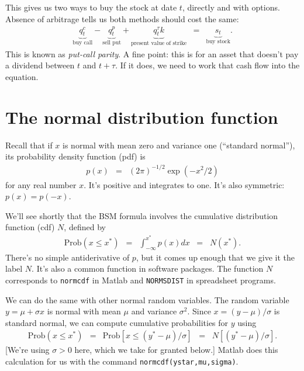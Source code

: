 \documentclass[11pt]{article}
\begin{document}
This gives us two ways to buy the stock at date $t$,
directly and with options.
Absence of arbitrage tells us both methods should cost the same:
\begin{eqnarray}
    \underbrace{q^c_t}_{\mbox{buy call}} -
    \underbrace{q^p_t}_{\mbox{sell put}} +
    \underbrace{q^\tau_t k}_{\mbox{present value of strike}}
    &=&
    \underbrace{s_t}_{\mbox{buy stock}} .
    \label{eq:put-call-parity}
\end{eqnarray}
This is known as {\it put-call parity\/}.
A fine point:  this is for an asset that doesn't pay a dividend
between $t$ and $t+\tau$.
If it does, we need to work that cash flow into the equation.


\section{The normal distribution function}


Recall that if $x$ is normal with mean zero and variance one (``standard normal''),
its probability density function (pdf) is
\begin{eqnarray}
    p(x) &=& (2 \pi)^{-1/2} \exp(-x^2/2)
    \label{eq:pdf-stdnormal}
\end{eqnarray}
for any real number $x$.
It's positive and integrates to one.
It's also symmetric:  $p(x) = p(-x)$.

We'll see shortly that the BSM formula
involves the cumulative distribution function (cdf) $N$,
defined by
\begin{eqnarray*}
    \mbox{Prob} (x \leq x^*)  &=& \int_{-\infty}^{x^*} p(x) dx
        \;\;=\;\; N(x^*).
\end{eqnarray*}
There's no simple antiderivative of $p$, but it comes up enough that
we give it the label $N$.  
It's also a common function in software packages.
The function $N$ corresponds to {\tt normcdf} in Matlab
and {\tt NORMSDIST} in spreadsheet programs.

We can do the same with other normal random variables.
The random variable $ y = \mu + \sigma x$ 
is normal with mean $\mu$ and variance $\sigma^2$.
Since $ x = (y-\mu)/\sigma$ is standard normal,
we can compute cumulative probabilities for $y$ using
\begin{eqnarray*}
    \mbox{Prob} (x \leq x^*)  &=& \mbox{Prob} [x \leq (y^*-\mu)/\sigma ]
        \;\;=\;\; N\left[ (y^*-\mu)/\sigma \right].
\end{eqnarray*}
[We're using $\sigma > 0$ here, which we take for granted below.]
Matlab does this calculation for us with the command {\tt normcdf(ystar,mu,sigma)}.
\end{document}
